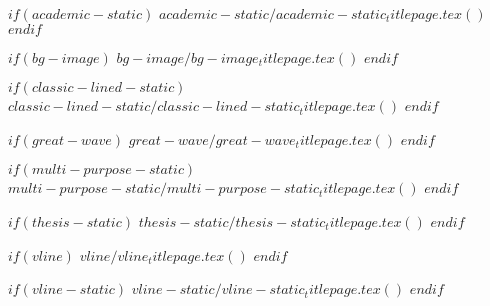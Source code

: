 $if(academic-static)$
$academic-static/academic-static_titlepage.tex()$
$endif$

$if(bg-image)$
$bg-image/bg-image_titlepage.tex()$
$endif$

$if(classic-lined-static)$
$classic-lined-static/classic-lined-static_titlepage.tex()$
$endif$

$if(great-wave)$
$great-wave/great-wave_titlepage.tex()$
$endif$

$if(multi-purpose-static)$
$multi-purpose-static/multi-purpose-static_titlepage.tex()$
$endif$

$if(thesis-static)$
$thesis-static/thesis-static_titlepage.tex()$
$endif$

$if(vline)$
$vline/vline_titlepage.tex()$
$endif$

$if(vline-static)$
$vline-static/vline-static_titlepage.tex()$
$endif$
